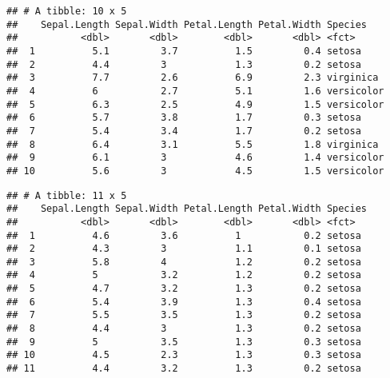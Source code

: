 \documentclass[]{book}
\newenvironment{Shaded}{\begin{snugshade}}{\end{snugshade}}
\newcommand{\DataTypeTok}[1]{\textcolor[rgb]{0.13,0.29,0.53}{#1}}
\newcommand{\DecValTok}[1]{\textcolor[rgb]{0.00,0.00,0.81}{#1}}
\newcommand{\KeywordTok}[1]{\textcolor[rgb]{0.13,0.29,0.53}{\textbf{#1}}}
\newcommand{\NormalTok}[1]{#1}
\newcommand{\OperatorTok}[1]{\textcolor[rgb]{0.81,0.36,0.00}{\textbf{#1}}}
\newcommand{\StringTok}[1]{\textcolor[rgb]{0.31,0.60,0.02}{#1}}
\begin{document}
\begin{Shaded}
\end{Shaded}

\begin{verbatim}
## # A tibble: 10 x 5
##    Sepal.Length Sepal.Width Petal.Length Petal.Width Species   
##           <dbl>       <dbl>        <dbl>       <dbl> <fct>     
##  1          5.1         3.7          1.5         0.4 setosa    
##  2          4.4         3            1.3         0.2 setosa    
##  3          7.7         2.6          6.9         2.3 virginica 
##  4          6           2.7          5.1         1.6 versicolor
##  5          6.3         2.5          4.9         1.5 versicolor
##  6          5.7         3.8          1.7         0.3 setosa    
##  7          5.4         3.4          1.7         0.2 setosa    
##  8          6.4         3.1          5.5         1.8 virginica 
##  9          6.1         3            4.6         1.4 versicolor
## 10          5.6         3            4.5         1.5 versicolor
\end{verbatim}

\begin{Shaded}
\end{Shaded}

\begin{verbatim}
## # A tibble: 11 x 5
##    Sepal.Length Sepal.Width Petal.Length Petal.Width Species
##           <dbl>       <dbl>        <dbl>       <dbl> <fct>  
##  1          4.6         3.6          1           0.2 setosa 
##  2          4.3         3            1.1         0.1 setosa 
##  3          5.8         4            1.2         0.2 setosa 
##  4          5           3.2          1.2         0.2 setosa 
##  5          4.7         3.2          1.3         0.2 setosa 
##  6          5.4         3.9          1.3         0.4 setosa 
##  7          5.5         3.5          1.3         0.2 setosa 
##  8          4.4         3            1.3         0.2 setosa 
##  9          5           3.5          1.3         0.3 setosa 
## 10          4.5         2.3          1.3         0.3 setosa 
## 11          4.4         3.2          1.3         0.2 setosa
\end{verbatim}
\end{document}

